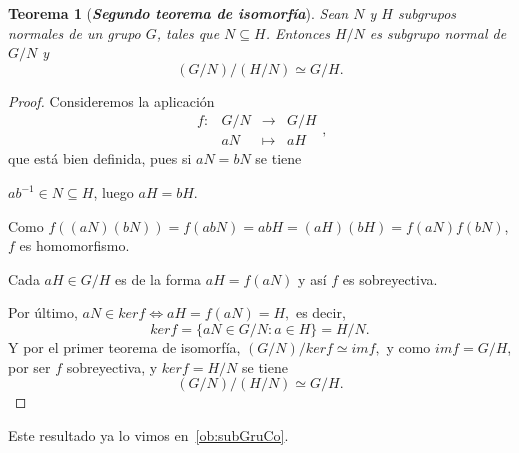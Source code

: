 \documentclass[12pt]{article}
\newtheorem{theorem}{Teorema}[section]
\begin{document}
\begin{theorem}[\textbf{\textit{Segundo teorema de isomorfía}}]
Sean $N$ y $H$ subgrupos normales de un grupo $G$, tales que $N \subseteq H$. Entonces $H/N$ es subgrupo normal de $G/N$ y $$(G/N)/(H/N) \simeq G/H.$$
\end{theorem}
\begin{proof} 
Consideremos la aplicación $$\begin{array}{rccl}
f\colon &G/N & \longrightarrow & G/H\\
&aN& \longmapsto &aH
\end{array}
,$$ que está bien definida, pues si $aN = bN$ se tiene 
\begin{center}
$ab^{-1} \in N \subseteq H$, luego $aH = bH$.
\end{center}
Como $f((aN)(bN)) = f(abN) = abH = (aH)(bH) = f(aN)f(bN)$, $f$ es homomorfismo.

Cada $aH \in G/H$ es de la forma $aH = f(aN)$ y así $f$ es sobreyectiva.

Por último, $aN \in ker f \Longleftrightarrow aH = f(aN) = H,$ es decir, $$ker f = \lbrace aN \in G/N : a \in H\rbrace = H/N.$$ Y por el primer teorema de isomorfía, $(G/N)/ker f \simeq im f,$ y como $im f = G/H$, por ser $f$ sobreyectiva, y $ker f = H/N$ se tiene $$(G/N)/(H/N) \simeq G/H.$$

\end{proof}

Este resultado ya lo vimos en~\ref{ob:subGruCo}.
\end{document}
